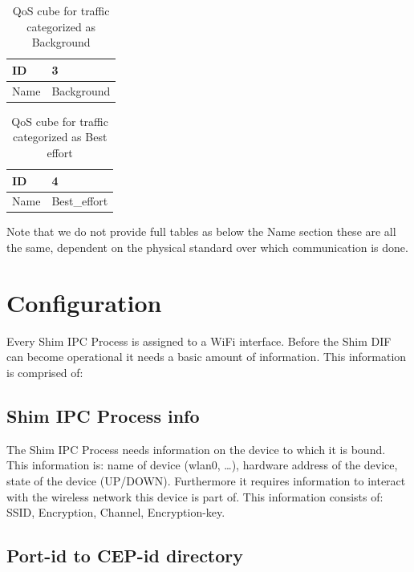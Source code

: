 \npar

\begin{table}[H]
	\begin{center}
		\begin{tabular}{|l|l|}
			\hline
				ID & 3  \\ \hline
				Name & Background \\ \hline
		\end{tabular}
		\caption{QoS cube for traffic categorized as Background}
	\end{center}
\end{table}

\npar

\begin{table}[H]
	\begin{center}
		\begin{tabular}{|l|l|}
			\hline
				ID & 4  \\ \hline
				Name & Best\_effort  \\ \hline
		\end{tabular}
		\caption{QoS cube for traffic categorized as Best effort}
	\end{center}
\end{table}

Note that we do not provide full tables as below the Name section these are all the same, dependent on the physical standard over which communication is done. 

\section{Configuration}

Every Shim IPC Process is assigned to a WiFi interface. Before the Shim DIF can become operational it needs a basic amount of information. This information is comprised of:

\subsection{Shim IPC Process info}

The Shim IPC Process needs information on the device to which it is bound. This information is: name of device (wlan0, \ldots), hardware address of the device, state of the device (UP/DOWN). Furthermore it requires information to interact with the wireless network this device is part of. This information consists of: SSID, Encryption, Channel, Encryption-key.

\subsection{Port-id to CEP-id directory}

